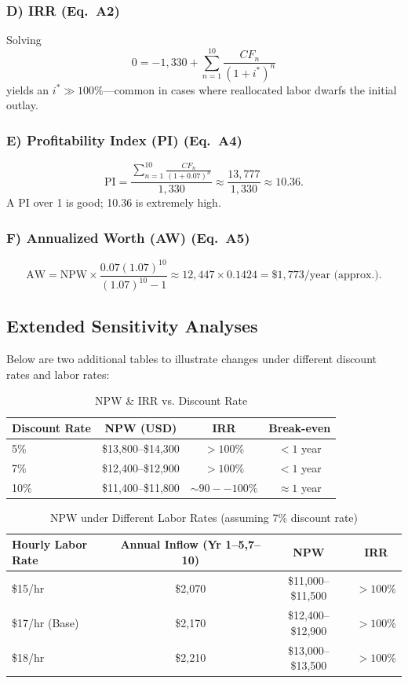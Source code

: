 \documentclass[12pt]{article}
\begin{document}
\subsubsection*{D) IRR (Eq.~A2)}
Solving
\[
0 = -1{,}330 + \sum_{n=1}^{10} \frac{CF_n}{(1 + i^*)^n}
\]
yields an $i^* \gg 100\%$—common in cases where reallocated labor dwarfs the initial outlay.

\subsubsection*{E) Profitability Index (PI) (Eq.~A4)}
\[
\text{PI} 
= \frac{\sum_{n=1}^{10}\frac{CF_n}{(1+0.07)^n}}{1{,}330}
\approx \frac{13{,}777}{1{,}330}
\approx 10.36.
\]
A PI over 1 is good; 10.36 is extremely high.

\subsubsection*{F) Annualized Worth (AW) (Eq.~A5)}
\[
\text{AW} 
= \text{NPW} \times \frac{0.07(1.07)^{10}}{(1.07)^{10}-1}
\approx 12{,}447 \times 0.1424 
= \$1{,}773 / \text{year (approx.)}.
\]

\newpage
\subsection*{Extended Sensitivity Analyses}

Below are two additional tables to illustrate changes under different discount rates and labor rates:

\begin{table}[h]
\centering
\caption{NPW \& IRR vs. Discount Rate}
\label{tab:sensitivity-discount}
\begin{tabular}{@{}lccc@{}}
\toprule
\textbf{Discount Rate} & \textbf{NPW (USD)} & \textbf{IRR} & \textbf{Break-even}\\
\midrule
5\% & \$13,800--\$14,300 & $>100\%$ & $<1$ year \\
7\% & \$12,400--\$12,900 & $>100\%$ & $<1$ year \\
10\% & \$11,400--\$11,800 & $\sim90--100\%$ & $\approx1$ year \\
\bottomrule
\end{tabular}
\end{table}

\begin{table}[h]
\centering
\caption{NPW under Different Labor Rates (assuming 7\% discount rate)}
\label{tab:sensitivity-labor}
\begin{tabular}{@{}lccc@{}}
\toprule
\textbf{Hourly Labor Rate} & \textbf{Annual Inflow (Yr 1--5,7--10)} & \textbf{NPW} & \textbf{IRR}\\
\midrule
\$15/hr & \$2,070 & \$11,000--\$11,500 & $>100\%$ \\
\$17/hr (Base) & \$2,170 & \$12,400--\$12,900 & $>100\%$ \\
\$18/hr & \$2,210 & \$13,000--\$13,500 & $>100\%$ \\
\bottomrule
\end{tabular}
\end{table}
\end{document}
